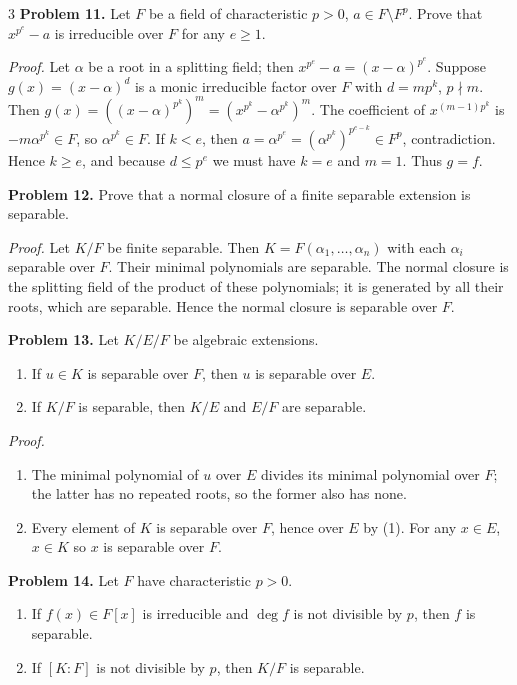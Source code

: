 \documentclass[10pt,landscape]{article}
\begin{document}
\begin{multicols}{3}
\noindent\textbf{Problem 11.} Let \(F\) be a field of characteristic \(p>0\), \(a\in F\setminus F^p\). Prove that \(x^{p^e}-a\) is irreducible over \(F\) for any \(e\ge1\).

\textit{Proof.} Let \(\alpha\) be a root in a splitting field; then \(x^{p^e}-a=(x-\alpha)^{p^e}\). Suppose \(g(x)=(x-\alpha)^d\) is a monic irreducible factor over \(F\) with \(d=mp^k\), \(p\nmid m\). Then \(g(x)=((x-\alpha)^{p^k})^m=(x^{p^k}-\alpha^{p^k})^m\). The coefficient of \(x^{(m-1)p^k}\) is \(-m\alpha^{p^k}\in F\), so \(\alpha^{p^k}\in F\). If \(k<e\), then \(a=\alpha^{p^e}=(\alpha^{p^k})^{p^{e-k}}\in F^p\), contradiction. Hence \(k\ge e\), and because \(d\le p^e\) we must have \(k=e\) and \(m=1\). Thus \(g=f\). 

\noindent\textbf{Problem 12.} Prove that a normal closure of a finite separable extension is separable.

\textit{Proof.} Let \(K/F\) be finite separable. Then \(K=F(\alpha_1,\dots,\alpha_n)\) with each \(\alpha_i\) separable over \(F\). Their minimal polynomials are separable. The normal closure is the splitting field of the product of these polynomials; it is generated by all their roots, which are separable. Hence the normal closure is separable over \(F\).

\noindent\textbf{Problem 13.} Let \(K/E/F\) be algebraic extensions.
\begin{enumerate}
\item If \(u\in K\) is separable over \(F\), then \(u\) is separable over \(E\).
\item If \(K/F\) is separable, then \(K/E\) and \(E/F\) are separable.
\end{enumerate}

\textit{Proof.}
\begin{enumerate}
\item The minimal polynomial of \(u\) over \(E\) divides its minimal polynomial over \(F\); the latter has no repeated roots, so the former also has none.
\item Every element of \(K\) is separable over \(F\), hence over \(E\) by (1). For any \(x\in E\), \(x\in K\) so \(x\) is separable over \(F\). 
\end{enumerate}

\noindent\textbf{Problem 14.} Let \(F\) have characteristic \(p>0\).
\begin{enumerate}
\item If \(f(x)\in F[x]\) is irreducible and \(\deg f\) is not divisible by \(p\), then \(f\) is separable.
\item If \([K:F]\) is not divisible by \(p\), then \(K/F\) is separable.
\end{enumerate}


\end{multicols}
\end{document}
